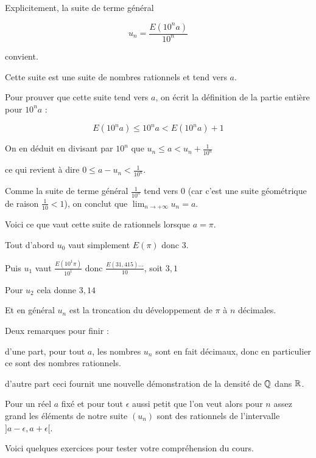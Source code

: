 Explicitement, la suite de terme général

 \[u_n = \frac{E(10^na)}{10^n} \]

 convient.

 Cette suite est une suite de nombres rationnels et tend vers $a$.
 
 
\change

Pour prouver que cette suite tend vers $a$, on écrit la définition de la partie entière pour $10^n a$ :

  \[E(10^na)\leq 10^na < E(10^na)+1\]

\change
  
  On en déduit en divisant par $10^n$ que 
\( u_n \leq a < u_n+\frac{1}{10^n} \)

\change

ce qui revient à dire \( 0 \leq a -u_n< \frac{1}{10^n} .\)

\change

Comme la suite de terme général $\frac{1}{10^n}$ tend vers $0$ 
(car c'est une suite géométrique de raison $\frac{1}{10}<1$), 
on conclut que $\lim_{n\to +\infty} u_n=a$.


\diapo


Voici ce que vaut cette suite de rationnels lorsque $a=\pi$.

\change

Tout d'abord $u_0$  vaut simplement $E(\pi)$ donc $3$.

\change

Puis $u_1$ vaut $\frac{E(10^1\pi)}{10^1}$ donc $\frac{E(31,415)\ldots}{10}$, soit $3,1$

\change

Pour $u_2$ cela donne $3,14$

\change

Et en général $u_n$ est la troncation du développement de $\pi$ à $n$ décimales.

\change

Deux remarques pour finir :

d'une part, pour tout $a$, les nombres $u_n$ sont en fait décimaux, donc en particulier ce sont des nombres rationnels.

\change

d'autre part ceci fournit une nouvelle démonstration de la densité de $\mathbb{Q}$ dans $\mathbb{R}$. 

Pour un réel $a$ fixé et pour tout $\epsilon $ aussi petit que l'on veut
alors pour $n$ assez grand les éléments de notre suite $(u_n)$
sont des rationnels de l'intervalle $]a-\epsilon,a+\epsilon[$.


\diapo

Voici quelques exercices pour tester votre compréhension du cours.



